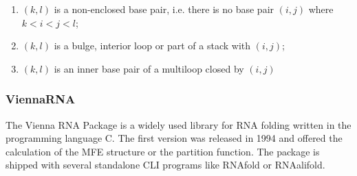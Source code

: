 \begin{enumerate}
	\item $(k,l)$ is a non-enclosed base pair, i.e. there is no base pair $(i,j)$ where $k<i<j<l$;
	\item $(k,l)$ is a bulge, interior loop or part of a stack with $(i,j)$;
	\item $(k,l)$ is an inner base pair of a multiloop closed by $(i,j)$
\end{enumerate}



\subsubsection{ViennaRNA}
The Vienna RNA Package is a widely used library for RNA folding written in the programming language C. The first version was released in 1994 and offered the calculation of the MFE structure or the partition function. The package is shipped with several standalone CLI programs like RNAfold or RNAalifold. 


